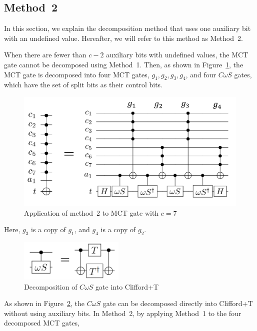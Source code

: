 \subsection{Method~2}
In this section, we explain the decomposition method \cite{abdessaied2016technology} that uses one auxiliary bit with an undefined value.
Hereafter, we will refer to this method as Method~2.
\par
When there are fewer than $c-2$ auxiliary bits with undefined values, the MCT gate cannot be decomposed using Method~1.
Then, as shown in Figure~\ref{mimap},
the MCT gate is decomposed into four MCT gates,
$g_{1}, g_{2}, g_{3}, g_{4}$, and four $C\omega S$ gates,
which have the set of split bits as their control bits.
\begin{figure}[tbp]
\centering
\includegraphics[width=0.95\linewidth]{img/mimapping.pdf}
\caption{Application of method~2 to MCT gate with $c=7$}
\label{mimap}
\end{figure}
Here, $g_{3}$ is a copy of $g_{1}$, and $g_{4}$ is a copy of $g_{2}$.
\begin{figure}[tbp]
\centering
\includegraphics[width=5cm]{img/comegas.pdf}
\caption{Decomposition of $C\omega S$ gate into Clifford+T}
\label{comegas}
\end{figure}
As shown in Figure~\ref{comegas},
the $C\omega S$ gate can be decomposed directly into Clifford+T without using auxiliary bits.
In Method~2,
by applying Method~1 to the four decomposed MCT gates,
